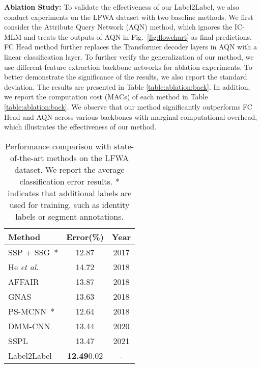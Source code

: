 \documentclass[runningheads]{llncs}
\begin{document}
\textbf{Ablation Study:} 
To validate the effectiveness of our Label2Label, we also conduct experiments on the LFWA dataset with two baseline methods. We first consider the Attribute Query Network (AQN) method, which ignores the IC-MLM and treats the outputs of AQN in Fig.~\ref{fig:flowchart} as final predictions. FC Head method further replaces the Transformer decoder layers in AQN with a linear classification layer. To further verify the generalization of our method, we use different feature extraction backbone networks for ablation experiments. To better demonstrate the significance of the results, we also report the standard deviation. The results are presented in Table \ref{table:ablation:back}.  In addition, we report the computation cost (MACs) of each method in Table \ref{table:ablation:back}.
We observe that our method significantly outperforms FC Head and AQN across various backbones with marginal computational overhead, which illustrates the effectiveness of our method.



\setlength{\intextsep}{0pt}
\begin{wraptable}{r}{.5\linewidth}
	\centering 
	\caption{Performance comparison with state-of-the-art methods on the LFWA dataset. We report the average classification error results. * indicates that additional labels are used for training, such as identity labels or segment annotations.}
	\label{table:result:lfw}
	\begin{tabular}{lcc}
    \toprule
    Method & Error(\%) &  Year\\
    \midrule
    SSP + SSG~\cite{kalayeh2017improving}* & 12.87 & 2017 \\
    He \emph{et al.}~\cite{he2018harnessing} & 14.72 & 2018 \\
    AFFAIR~\cite{li2018landmark} & 13.87 & 2018 \\
    GNAS~\cite{huang2018gnas} & 13.63 & 2018 \\
    PS-MCNN~\cite{cao2018partially}* & 12.64 & 2018 \\
    DMM-CNN~\cite{mao2020deep} & 13.44 & 2020\\
    SSPL~\cite{shu2021learning} & 13.47 & 2021 \\
    \midrule
    Label2Label & \textbf{12.49}0.02 & - \\
    \bottomrule
    \end{tabular}
\end{wraptable}
\end{document}
